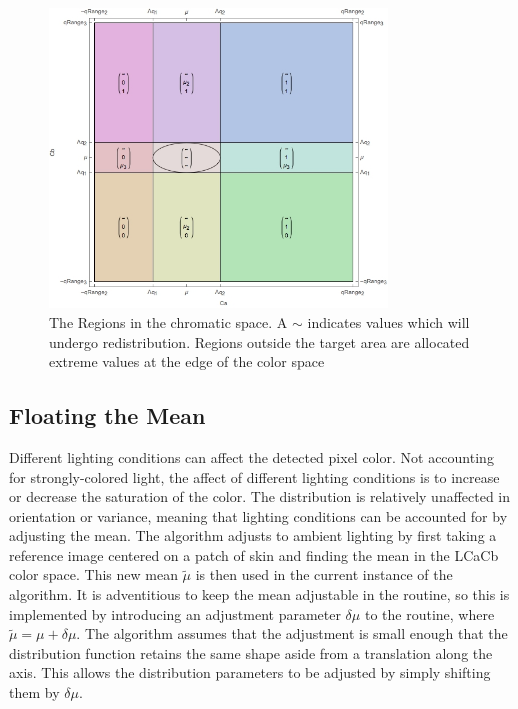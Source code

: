   \begin{figure}[h!]
    \centering
      \includegraphics[width=0.80\textwidth]{Chapter4/Figs/PartitioningRegion.jpg}
      \caption{The Regions in the chromatic space. A $ \sim $ indicates values which will undergo redistribution. Regions outside the target area are allocated extreme values at the edge of the color space}  \label{fig:PartitioningRegions}
  \end{figure}
  
  
  
  \subsection{Floating the Mean}\label{sec:FloatingTheMean}
  Different lighting conditions can affect the detected pixel color. Not accounting for strongly-colored light, the affect of different lighting conditions is to increase or decrease the saturation of the color. The distribution is relatively unaffected in orientation or variance, meaning that lighting conditions can be accounted for by adjusting the mean. 
  \newcommand{\newMean}{\widetilde{\mu}}
  The algorithm adjusts to ambient lighting by first taking a reference image centered on a patch of skin and finding the mean in the LCaCb color space. This new mean $\newMean$ is then used in the current instance of the algorithm. It is adventitious to keep the mean adjustable in the routine, so this is implemented by introducing an adjustment parameter $\delta\mu$ to the routine, where $\newMean = \mu + \delta\mu$. The algorithm assumes that the adjustment is small enough that the distribution function retains the same shape aside from a translation along the axis. This allows the distribution parameters to be adjusted by simply shifting them by $\delta\mu$. 
  
